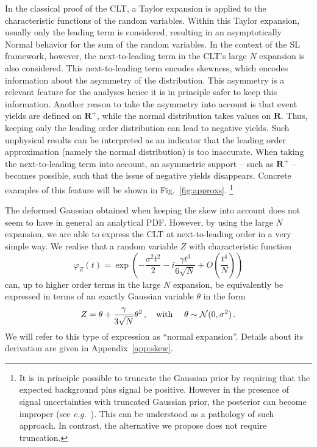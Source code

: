 \documentclass[11pt]{article}
\newcommand{\be}{\begin{equation}}
\newcommand{\ee}{\end{equation}}
\begin{document}
In the classical proof of the CLT, a Taylor expansion is applied to the characteristic functions of the random variables.
Within this Taylor expansion, usually only the leading term is considered, resulting in an asymptotically Normal behavior for
the sum of the random variables.
In the context of the SL framework, however, the next-to-leading  term in the CLT's large $N$ expansion is also considered. 
 This next-to-leading term encodes skewness, which encodes information about the asymmetry of the distribution. This asymmetry is a relevant feature for the analyses hence it is in principle safer to keep this information. 
Another reason to take the asymmetry  into account is that event yields are defined on $\mathbf{R}^+$, while the normal distribution takes values on 
 $\mathbf{R}$. Thus, keeping only the leading order distribution can lead to negative yields.
Such unphysical results can be interpreted as an indicator that the leading order approximation (namely the normal distribution) is too inaccurate. When taking the next-to-leading term into account, an asymmetric support -- such as $\mathbf{R}^+$ --  becomes possible, such that the issue of negative yields disappears. Concrete examples of this feature will be shown in  Fig.~\ref{fig:approxs}. 
\footnote{It is in principle possible to truncate the Gaussian prior by requiring that the expected background plus signal be positive.  However in the presence of signal uncertainties with truncated Gaussian prior, the posterior can become improper   (see \textit{e.g.}~\cite{Obj_Bayes}). This can be understood as a pathology of such approach. In contrast, the alternative we propose does not require truncation. }



%



The deformed Gaussian obtained when keeping the skew into account does not seem to have in general an analytical PDF. 
However, by using the large $N$ expansion, we are able to express the CLT at next-to-leading order in a very simple way. 
We realise that a random variable $Z$ with characteristic function
\be
\varphi_Z(t)=\exp\left(-\frac{\sigma^2 t^2}{2}-i \frac{\gamma t^3}{6 \sqrt{N}} +O\left(\frac{t^4}{N}\right)\right) \label{eq:CF_CLT}
 \ee
can, up to higher order terms in the large $N$ expansion, be equivalently be expressed in terms of an exactly Gaussian variable $\theta$ in the form
\be
Z= \theta+\frac{\gamma}{3\sqrt{N}}\theta^2\,,  \quad \textrm{with } \quad \theta\sim{\cal N}(0,\sigma^2)\,. \label{eq:ZskewCLT}
\ee
We will refer to this type of expression as ``normal expansion''. Details about its derivation are given in Appendix~\ref{app:skew}.
\end{document}
